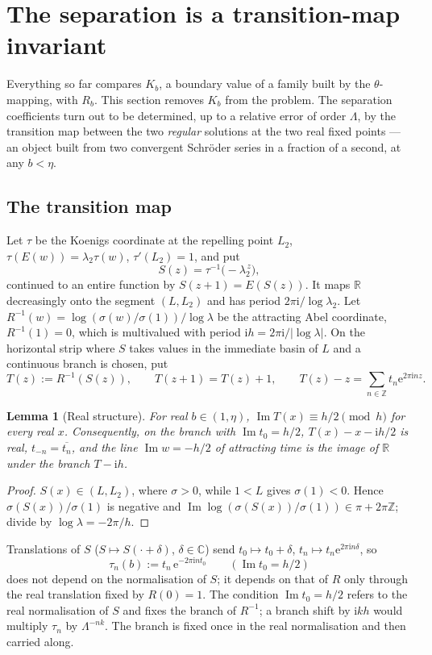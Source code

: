\documentclass[11pt,a4paper]{article}
\newtheorem{lemma}[theorem]{Lemma}
\theoremstyle{definition}
\newcommand{\Rr}{R}
\newcommand{\Kk}{K}
\newcommand{\eee}{\mathrm{e}}
\newcommand{\ii}{\mathrm{i}}
\begin{document}
\section{The separation is a transition-map invariant}\label{sec:transition}

Everything so far compares $\Kk_b$, a boundary value of a family built by the
$\theta$-mapping, with $\Rr_b$.  This section removes $\Kk_b$ from the
problem.  The separation coefficients turn out to be determined, up to a
relative error of order $\Lambda$, by the transition map between the two
\emph{regular} solutions at the two real fixed points --- an object built from
two convergent Schr\"oder series in a fraction of a second, at any $b<\eta$.

\subsection{The transition map}
Let $\tau$ be the Koenigs coordinate at the repelling point $L_2$,
$\tau(E(w))=\lambda_2\tau(w)$, $\tau'(L_2)=1$, and put
\[
 S(z)=\tau^{-1}\bigl(-\lambda_2^{\,z}\bigr),
\]
continued to an entire function by $S(z+1)=E(S(z))$.  It maps $\mathbb R$
decreasingly onto the segment $(L,L_2)$ and has period $2\pi\ii/\log\lambda_2$.
Let $\Rr^{-1}(w)=\log(\sigma(w)/\sigma(1))/\log\lambda$ be the attracting Abel
coordinate, $\Rr^{-1}(1)=0$, which is multivalued with period
$\ii h=2\pi\ii/|\log\lambda|$.  On the horizontal strip where $S$ takes values
in the immediate basin of $L$ and a continuous branch is chosen, put
\[
 T(z):=\Rr^{-1}(S(z)),\qquad T(z+1)=T(z)+1,\qquad
 T(z)-z=\sum_{n\in\mathbb Z}t_n\eee^{2\pi\ii nz}.
\]

\begin{lemma}[Real structure]\label{lem:realT}
For real $b\in(1,\eta)$, $\operatorname{Im}T(x)\equiv h/2\pmod h$ for every
real $x$.  Consequently, on the branch with $\operatorname{Im}t_0=h/2$,
$T(x)-x-\ii h/2$ is real, $t_{-n}=\overline{t_n}$, and the line
$\operatorname{Im}w=-h/2$ of attracting time is the image of $\mathbb R$ under
the branch $T-\ii h$.
\end{lemma}

\begin{proof}
$S(x)\in(L,L_2)$, where $\sigma>0$, while $1<L$ gives $\sigma(1)<0$.  Hence
$\sigma(S(x))/\sigma(1)$ is negative and
$\operatorname{Im}\log(\sigma(S(x))/\sigma(1))\in\pi+2\pi\mathbb Z$; divide
by $\log\lambda=-2\pi/h$.
\end{proof}

Translations of $S$ ($S\mapsto S(\cdot+\delta)$, $\delta\in\mathbb C$) send
$t_0\mapsto t_0+\delta$, $t_n\mapsto t_n\eee^{2\pi\ii n\delta}$, so
\begin{equation}\label{eq:taun}
 \tau_n(b):=t_n\,\eee^{-2\pi\ii n t_0}\qquad(\operatorname{Im}t_0=h/2)
\end{equation}
does not depend on the normalisation of $S$; it depends on that of $\Rr$
only through the real translation fixed by $\Rr(0)=1$.  The condition
$\operatorname{Im}t_0=h/2$ refers to the real normalisation of $S$ and fixes the
branch of $\Rr^{-1}$; a branch shift by $\ii kh$ would multiply $\tau_n$ by
$\Lambda^{-nk}$.  The branch is fixed once in the real normalisation and then
carried along.
\end{document}
